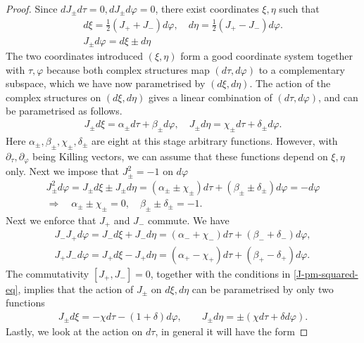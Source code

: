 \documentclass[10pt]{report}
\theoremstyle{definition}
\begin{document}
\begin{proof}
Since $dJ_\pm d\tau = 0, dJ_\pm d\varphi = 0$, there exist coordinates $\xi,\eta$ such that 
\begin{gather}
    d\xi = \frac{1}{2}(J_++J_-)d\varphi, \quad d\eta = \frac{1}{2}(J_+-J_-)d\varphi. \nonumber \\
    J_\pm d\varphi= d\xi \pm d\eta
\end{gather}
The two coordinates introduced $(\xi,\eta)$ form a good coordinate system together with $\tau,\varphi$ because both complex structures map $(d\tau,d\varphi)$ to a complementary subspace, which we have now parametrised by $(d\xi,d\eta)$. The action of the complex structures on $(d\xi,d\eta)$ gives a linear combination of $(d\tau,d\varphi)$, and can be parametrised as follows. 
\begin{gather}
    J_\pm d\xi = \alpha_\pm d\tau + \beta_\pm d\varphi, \quad J_\pm d\eta = \chi_\pm d\tau + \delta_\pm d\varphi.
\end{gather}
Here $\alpha_\pm,\beta_\pm,\chi_\pm,\delta_\pm$ are eight at this stage arbitrary functions. However, with $\partial_\tau,\partial_\varphi$ being Killing vectors, we can assume that these functions depend on $\xi,\eta$ only. Next we impose that $J_\pm^2 = -1$ on $d\varphi$
\begin{align}\label{J-pm-squared-eq}
    J_\pm^2 d\varphi = J_\pm d\xi \pm J_\pm d\eta = (\alpha_\pm \pm \chi_\pm) d\tau + (\beta_\pm \pm \delta_\pm) d\varphi = -d\varphi \nonumber \\
    \Rightarrow \quad \alpha_\pm \pm \chi_\pm = 0, \quad \beta_\pm \pm \delta_\pm =-1.
\end{align}
Next we enforce that $J_+$ and $J_-$ commute. We have
\begin{align}
    J_- J_+ d\varphi = J_- d\xi + J_- d\eta = (\alpha_- +\chi_-) d\tau +(\beta_- +\delta_-)  d\varphi, \nonumber \\
    J_+ J_- d\varphi = J_+ d\xi - J_+ d\eta = (\alpha_+ -\chi_+) d\tau +(\beta_+ -\delta_+)  d\varphi.
\end{align}
The commutativity $[J_+,J_-]=0$, together with the conditions in \cref{J-pm-squared-eq}, implies that the action of $J_\pm$ on $d\xi,d\eta$ can be parametrised by only two functions
\begin{gather}
    J_\pm d\xi = -\chi d\tau - (1+\delta) d\varphi, \qquad J_\pm d\eta = \pm (\chi d\tau + \delta d\varphi).
\end{gather}
Lastly, we look at the action on $d\tau$, in general it will have the form 

\end{proof}
\end{document}
